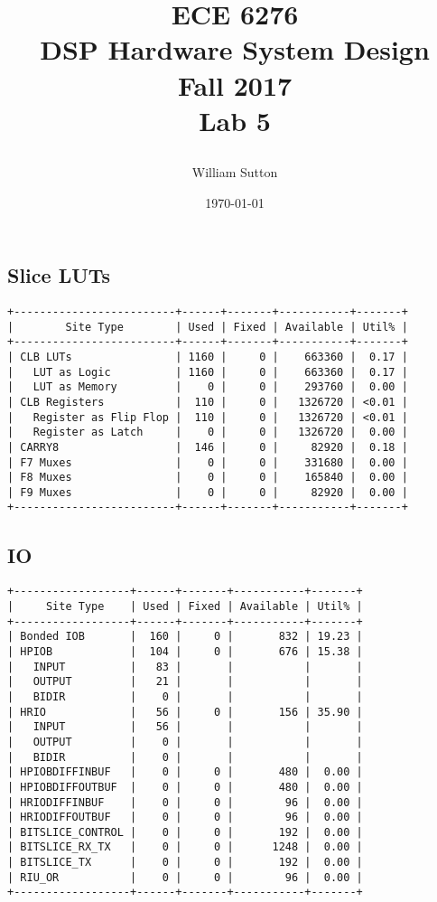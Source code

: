 \documentclass[11pt]{report}
\title{
		\Huge{
				\textbf{ECE 6276
						\\DSP Hardware System Design
						\\Fall 2017}}
			\\[2cm]
		\LARGE{
			\textnormal{Lab 5}}
			\\[1cm]
			\date{\today}
		\large{
			\author{William Sutton}
		}}
\begin{document}
\lstset{language=MATLAB}
\maketitle
	

		
\newpage		
\subsection*{Slice LUTs}
\small
\begin{lstlisting}
+-------------------------+------+-------+-----------+-------+
|        Site Type        | Used | Fixed | Available | Util% |
+-------------------------+------+-------+-----------+-------+
| CLB LUTs                | 1160 |     0 |    663360 |  0.17 |
|   LUT as Logic          | 1160 |     0 |    663360 |  0.17 |
|   LUT as Memory         |    0 |     0 |    293760 |  0.00 |
| CLB Registers           |  110 |     0 |   1326720 | <0.01 |
|   Register as Flip Flop |  110 |     0 |   1326720 | <0.01 |
|   Register as Latch     |    0 |     0 |   1326720 |  0.00 |
| CARRY8                  |  146 |     0 |     82920 |  0.18 |
| F7 Muxes                |    0 |     0 |    331680 |  0.00 |
| F8 Muxes                |    0 |     0 |    165840 |  0.00 |
| F9 Muxes                |    0 |     0 |     82920 |  0.00 |
+-------------------------+------+-------+-----------+-------+
\end{lstlisting}


\newpage
\subsection*{IO}
\small
\begin{lstlisting}
+------------------+------+-------+-----------+-------+
|     Site Type    | Used | Fixed | Available | Util% |
+------------------+------+-------+-----------+-------+
| Bonded IOB       |  160 |     0 |       832 | 19.23 |
| HPIOB            |  104 |     0 |       676 | 15.38 |
|   INPUT          |   83 |       |           |       |
|   OUTPUT         |   21 |       |           |       |
|   BIDIR          |    0 |       |           |       |
| HRIO             |   56 |     0 |       156 | 35.90 |
|   INPUT          |   56 |       |           |       |
|   OUTPUT         |    0 |       |           |       |
|   BIDIR          |    0 |       |           |       |
| HPIOBDIFFINBUF   |    0 |     0 |       480 |  0.00 |
| HPIOBDIFFOUTBUF  |    0 |     0 |       480 |  0.00 |
| HRIODIFFINBUF    |    0 |     0 |        96 |  0.00 |
| HRIODIFFOUTBUF   |    0 |     0 |        96 |  0.00 |
| BITSLICE_CONTROL |    0 |     0 |       192 |  0.00 |
| BITSLICE_RX_TX   |    0 |     0 |      1248 |  0.00 |
| BITSLICE_TX      |    0 |     0 |       192 |  0.00 |
| RIU_OR           |    0 |     0 |        96 |  0.00 |
+------------------+------+-------+-----------+-------+
\end{lstlisting}
\end{document}
